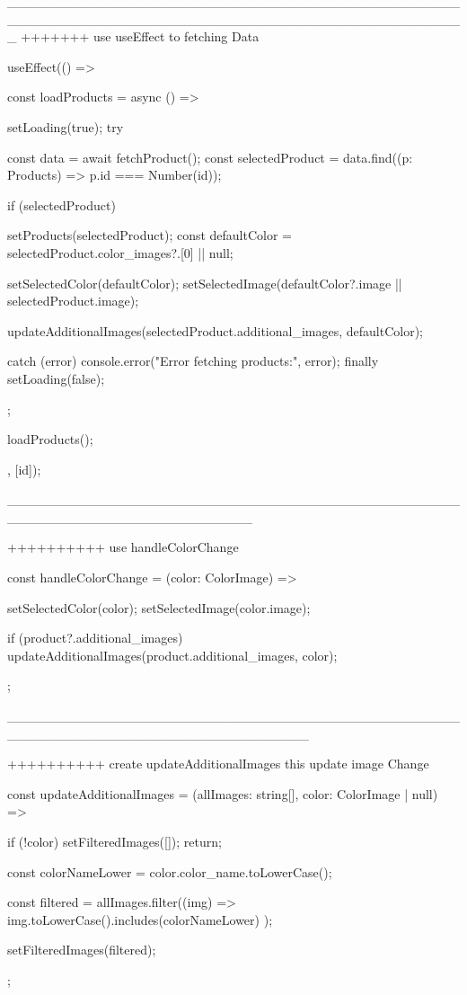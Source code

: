 _________________________________________________________________________________________________
+++++++  use useEffect to fetching Data

useEffect(() => {
    const loadProducts = async () => {
        setLoading(true);
        try {
            const data = await fetchProduct();
            const selectedProduct = data.find((p: Products) => p.id === Number(id));

            if (selectedProduct) {
                setProducts(selectedProduct);
                const defaultColor = selectedProduct.color_images?.[0] || null;

                setSelectedColor(defaultColor);
                setSelectedImage(defaultColor?.image || selectedProduct.image);

                updateAdditionalImages(selectedProduct.additional_images, defaultColor);
            }
        } catch (error) {
            console.error("Error fetching products:", error);
        } finally {
            setLoading(false);
        }
    };

    loadProducts();
}, [id]);

__________________________________________________________________________


++++++++++ use handleColorChange 

const handleColorChange = (color: ColorImage) => {
  setSelectedColor(color);
  setSelectedImage(color.image);

  if (product?.additional_images) {
    updateAdditionalImages(product.additional_images, color);
  }
};

________________________________________________________________________________

++++++++++ create updateAdditionalImages this update image Change

const updateAdditionalImages = (allImages: string[], color: ColorImage | null) => {
  if (!color) {
    setFilteredImages([]);
    return;
  }

  const colorNameLower = color.color_name.toLowerCase();

  const filtered = allImages.filter((img) =>
    img.toLowerCase().includes(colorNameLower)
  );

  setFilteredImages(filtered);
};
